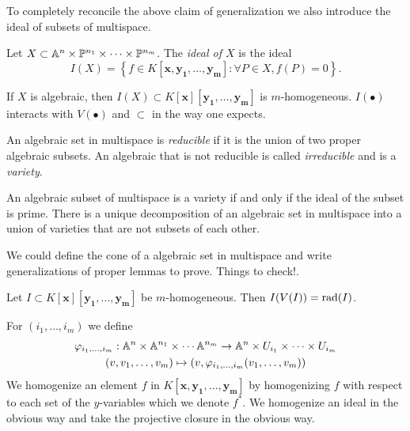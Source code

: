         To completely reconcile the above claim of generalization we also introduce the ideal of subsets of multispace.
        \begin{definition}
            Let $X\subset \mathbb{A}^n\times \mathbb{P}^{n_1}\times \cdots \times \mathbb{P}^{n_m}$. The \textit{ideal of $X$} is the ideal 
            $$I(X) = \left\{ f\in K[\mathbf{x},\mathbf{y_1},\dots,\mathbf{y_m}] : \forall P \in X,f(P)=0\right\}.$$
        \end{definition}
        \begin{remark}
            If $X$ is algebraic, then $I(X)\subset K[\mathbf{x}][\mathbf{y_1},\dots,\mathbf{y_m}]$ is $m$-homogeneous. $I(\bullet)$ interacts with $V(\bullet)$ and $\subset$ in the way one expects. 
        \end{remark}
        \begin{definition}
            An algebraic set in multispace is \textit{reducible} if it is the union of two proper algebraic subsets. An algebraic that is not reducible is called \textit{irreducible} and is a \textit{variety}. 
        \end{definition}
        \begin{remark}
            An algebraic subset of multispace is a variety if and only if the ideal of the subset is prime. There is a unique decomposition of an algebraic set in multispace into a union of varieties that are not subsets of each other.  
        \end{remark}
        We could define the cone of a algebraic set in multispace and write generalizations of proper lemmas to prove. {\Large Things to check!}. 
        \begin{theorem}
            Let $I\subset K[\mathbf{x}][\mathbf{y_1},\dots,\mathbf{y_m}]$ be $m$-homogeneous. Then $I(V(I))=\mathrm{rad}(I)$.
        \end{theorem}
        \begin{definition}
            For $(i_1,\dots,i_m)$ we define
            \begin{gather*}
                \varphi_{i_1,\dots,i_m}: \mathbb{A}^n\times \mathbb{A}^{n_1}\times \cdots \mathbb{A}^{n_m} \rightarrow \mathbb{A}^n\times U_{i_1}\times \cdots \times U_{i_m}\\
                (v,v_1,\dots,v_m)\mapsto (v,\varphi_{i_1,\dots,i_m}(v_1,\dots,v_m))
            \end{gather*}
            We homogenize an element $f$ in $K[\mathbf{x},\mathbf{y_1},\dots, \mathbf{y_m}]$ by homogenizing $f$ with respect to each set of the $y$-variables which we denote $f^\ast$. We homogenize an ideal in the obvious way and take the projective closure in the obvious way.  
        \end{definition}
